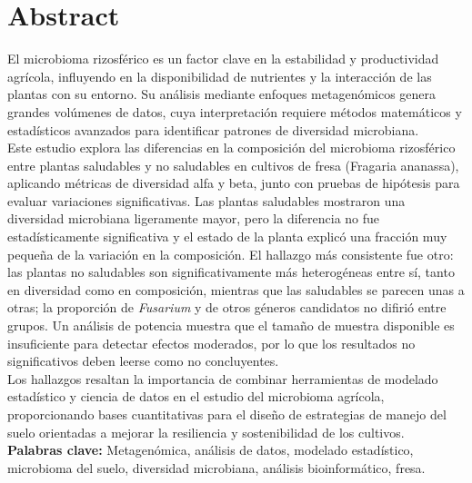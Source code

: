 \documentclass[11pt]{book}
\begin{document}
\tableofcontents


\chapter*{Abstract}
\thispagestyle{empty}

El microbioma rizosférico es un factor clave en la estabilidad y productividad agrícola, influyendo en la disponibilidad de nutrientes y la interacción de las plantas con su entorno. Su análisis mediante enfoques metagenómicos genera grandes volúmenes de datos, cuya interpretación requiere métodos matemáticos y estadísticos avanzados para identificar patrones de diversidad microbiana.\\

Este estudio explora las diferencias en la composición del microbioma rizosférico entre plantas saludables y no saludables en cultivos de fresa (Fragaria ananassa), aplicando métricas de diversidad alfa y beta, junto con pruebas de hipótesis para evaluar variaciones significativas. Las plantas saludables mostraron una diversidad microbiana ligeramente mayor, pero la diferencia no fue estadísticamente significativa y el estado de la planta explicó una fracción muy pequeña de la variación en la composición. El hallazgo más consistente fue otro: las plantas no saludables son significativamente más heterogéneas entre sí, tanto en diversidad como en composición, mientras que las saludables se parecen unas a otras; la proporción de \textit{Fusarium} y de otros géneros candidatos no difirió entre grupos. Un análisis de potencia muestra que el tamaño de muestra disponible es insuficiente para detectar efectos moderados, por lo que los resultados no significativos deben leerse como no concluyentes.\\

Los hallazgos resaltan la importancia de combinar herramientas de modelado estadístico y ciencia de datos en el estudio del microbioma agrícola, proporcionando bases cuantitativas para el diseño de estrategias de manejo del suelo orientadas a mejorar la resiliencia y sostenibilidad de los cultivos.\\

\textbf{Palabras clave:} Metagenómica, análisis de datos, modelado estadístico, microbioma del suelo, diversidad microbiana, análisis bioinformático, fresa.
\end{document}
